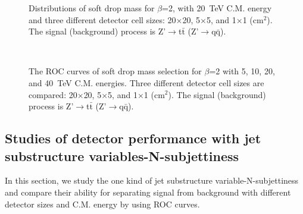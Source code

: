 \documentclass[12pt,twoside,a4paper,an,final]{cms-tdr}
\begin{document}
\begin{figure}
\begin{center}
\end{center}
\caption{
Distributions of soft drop mass for $\beta$=2, with 20~TeV C.M. energy and three different detector cell sizes: 20$\times$20, 
5$\times$5, and 1$\times$1 ($\mathrm{cm}^{2}$). The signal (background) process is 
Z'$\rightarrow$t$\bar{\mathrm{t}}$ (Z'$\rightarrow$q$\bar{\mathrm{q}}$).
}
\label{fig:cluster_mass_sdb2_tt}
\end{figure}


\begin{figure}
\begin{center}
  \\
\end{center}
\caption{
The ROC curves of soft drop mass selection for $\beta$=2
with 5, 10, 20, and 40~TeV C.M. energies. 
Three different detector cell sizes are compared: 20$\times$20, 
5$\times$5, and 1$\times$1 ($\mathrm{cm}^{2}$). 
The signal (background) process is Z'$\rightarrow$t$\bar{\mathrm{t}}$
(Z'$\rightarrow$q$\bar{\mathrm{q}}$).
}
\label{fig:cluster_mass_sdb2_tt_ROC}
\end{figure}
\subsection{Studies of detector performance with jet substructure variables-N-subjettiness}
In this section, we study the one kind of jet substructure variable-N-subjettiness and compare their ability for separating signal from background with different detector sizes and C.M. energy by using ROC curves.\\
\end{document}
